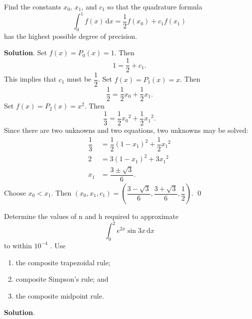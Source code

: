 \documentclass[11pt]{article}
\theoremstyle{break}
\newcommand{\ddi}{\text{$\,$d}}
\numberwithin{equation}{theorem}
\begin{document}
\newpage
\begin{problem}\label{problem 7} %
    Find the constants $x_0$, $x_1$, and $c_1$ so that the quadrature formula $$\int_0^1f(x)\ddi x=\dfrac{1}{2}f(x_0)+c_1f(x_1)$$ has the highest possible degree of precision.
\end{problem}
\textbf{Solution}. Set $f(x)=P_0(x)=1$. Then $$1=\dfrac{1}{2}+c_1.$$ This implies that $c_1$ must be $\dfrac{1}{2}$. Set $f(x)=P_1(x)=x$. Then $$\dfrac{1}{2}=\dfrac{1}{2}x_0+\dfrac{1}{2}x_1.$$ Set $f(x)=P_2(x)=x^2$. Then $$\dfrac{1}{3}=\dfrac{1}{2}{x_0}^2+\dfrac{1}{2}{x_1}^2.$$ Since there are two unknowns and two equations, two unknowns may be solved: \begin{align*}
    \dfrac{1}{3}&=\dfrac{1}{2}\left(1-x_1\right)^2+\dfrac{1}{2}{x_1}^2\\
    2&=3(1-x_1)^2+3{x_1}^2\\
    x_1&=\dfrac{3\pm\sqrt{3}}{6}.
\end{align*}
Choose $x_0<x_1$. Then $(x_0, x_1, c_1)=\left(\dfrac{3-\sqrt{3}}{6}, \dfrac{3+\sqrt{3}}{6}, \dfrac{1}{2}\right)$. \qed


\newpage
\begin{problem}\label{problem 8} %
    Determine the values of n and h required to approximate $$\int_{0}^{2}e^{2x}\sin 3x\ddi x$$ to within $10^{-4}$ . Use
    \begin{enumerate}
        \item the composite trapezoidal rule;
        \item composite Simpson's rule; and
        \item the composite midpoint rule.
    \end{enumerate}
\end{problem}
\textbf{Solution}. 
\end{document}
